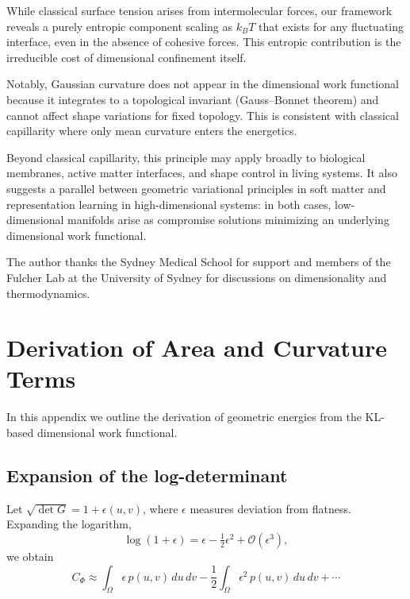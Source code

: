 \documentclass[aps,pre,twocolumn,superscriptaddress,floatfix]{revtex4-2}
\begin{document}
While classical surface tension arises from intermolecular forces, our framework reveals a purely entropic component scaling as $k_B T$ that exists for any fluctuating interface, even in the absence of cohesive forces. This entropic contribution is the irreducible cost of dimensional confinement itself.

Notably, Gaussian curvature does not appear in the dimensional work functional because it integrates to a topological invariant (Gauss--Bonnet theorem) and cannot affect shape variations for fixed topology. This is consistent with classical capillarity where only mean curvature enters the energetics.

Beyond classical capillarity, this principle may apply broadly to biological membranes, active matter interfaces, and shape control in living systems. It also suggests a parallel between geometric variational principles in soft matter and representation learning in high-dimensional systems: in both cases, low-dimensional manifolds arise as compromise solutions minimizing an underlying dimensional work functional.

\begin{acknowledgments}
The author thanks the Sydney Medical School for support and members of the Fulcher Lab at the University of Sydney for discussions on dimensionality and thermodynamics.
\end{acknowledgments}

\appendix

\section{Derivation of Area and Curvature Terms}
\label{app:derivation}

In this appendix we outline the derivation of geometric energies from the KL-based dimensional work functional.

\subsection{Expansion of the log-determinant}

Let $\sqrt{\det G} = 1 + \epsilon(u,v)$, where $\epsilon$ measures deviation from flatness. Expanding the logarithm,
\begin{equation}
\log(1+\epsilon) = \epsilon - \tfrac{1}{2}\epsilon^2 + \mathcal{O}(\epsilon^3),
\end{equation}
we obtain
\begin{equation}
C_\Phi \approx \int_\Omega \epsilon\, p(u,v)\,du\,dv - \frac{1}{2}\int_\Omega \epsilon^2\, p(u,v)\,du\,dv + \cdots
\end{equation}
\end{document}
